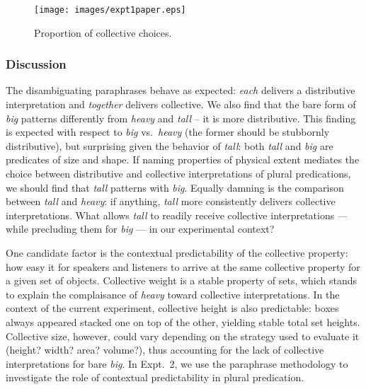 \documentclass[linguex]{sp}
\begin{document}
\begin{figure}[h]
	\centering
	\texttt{[image: images/expt1paper.eps]}
	\vspace{-15pt}
	\caption{Proportion of collective choices.}\label{results2}
\end{figure}


\subsubsection{Discussion}

The disambiguating paraphrases behave as expected: \emph{each} delivers a distributive interpretation and \emph{together} delivers collective. We also find that the bare form of \emph{big} patterns differently from \emph{heavy} and \emph{tall} -- it is more distributive. This finding is expected with respect to \textit{big} vs.~\textit{heavy} (the former should be stubbornly distributive), but surprising given the behavior of \textit{tall}: both \emph{tall} and \emph{big} are predicates of size and shape. If naming properties of physical extent mediates the choice between distributive and collective interpretations of plural predications, we should find that \emph{tall} patterns with \emph{big}. Equally damning is the comparison between \emph{tall} and \emph{heavy}: if anything, \emph{tall} more consistently delivers collective interpretations. What allows \emph{tall} to readily receive collective interpretations --- while precluding them for \emph{big} --- in our experimental context? 

One candidate factor is the contextual predictability of the collective property: how easy it for speakers and listeners to arrive at the same collective property for a given set of objects. Collective weight is a stable property of sets, which stands to explain the complaisance of \emph{heavy} toward collective interpretations. In the context of the current experiment, collective height is also predictable: boxes always appeared stacked one on top of the other, yielding stable total set heights. Collective size, however, could vary depending on the strategy used to evaluate it (height? width? area? volume?), thus accounting for the lack of collective interpretations for bare \emph{big}. In Expt.~2, we use the paraphrase methodology to investigate the role of contextual predictability in plural predication.
\end{document}
